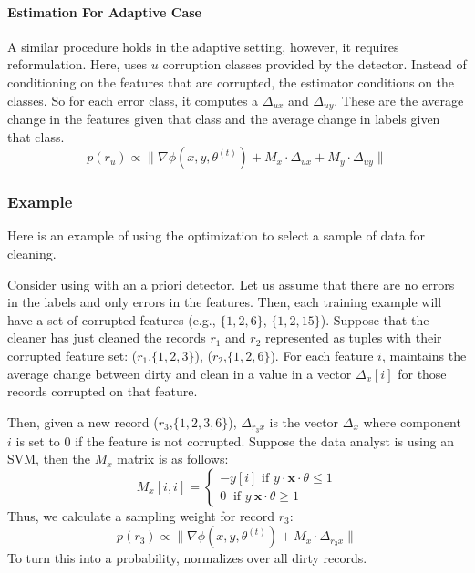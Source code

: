 \paragraph{Estimation For Adaptive Case}
A similar procedure holds in the adaptive setting, however, it requires reformulation.
Here, \sys uses $u$ corruption classes provided by the detector.
Instead of conditioning on the features that are corrupted, the estimator conditions on the classes.
So for each error class, it computes a $\Delta_{ux}$ and $\Delta_{uy}$.
These are the average change in the features given that class and the average change in labels given that class.
\[
p(r_u)\propto\|\nabla\phi(x,y,\theta^{(t)}) + M_x \cdot \Delta_{ux} +  M_y \cdot \Delta_{uy}\|
\] 

\subsubsection{Example}
Here is an example of using the optimization to select a sample of data for cleaning.
\begin{example}\label{estex}
Consider using \sys with an a priori detector.
Let us assume that there are no errors in the labels and only errors in the features.
Then, each training example will have a set of corrupted features (e.g., $\{1,2,6\}$, $\{1,2,15\}$).
Suppose that the cleaner has just cleaned the records $r_1$ and $r_2$ represented as tuples with their corrupted feature set: ($r_1$,$\{1,2,3\}$), ($r_2$,$\{1,2,6\}$).
For each feature $i$, \sys maintains the average change between dirty and clean in a value in a vector $\Delta_x[i]$ for those records corrupted on that feature. 

Then, given a new record ($r_3$,$\{1,2,3,6\}$), $\Delta_{r_3x}$ is the vector $\Delta_x$ where component $i$ is set to 0 if the feature is not corrupted.
Suppose the data analyst is using an SVM, then the $M_x$ matrix is as follows:
\[
M_x[i,i] = \begin{cases}      
-y[i] \text{ if } y\cdot\boldsymbol{x}\cdot\theta \le 1 \\
0\ \text{ if } y\ \boldsymbol{x}\cdot\theta \geq 1      
\end{cases} 
\]
Thus, we calculate a sampling weight for record $r_3$:
\[
p(r_3) \propto\|\nabla\phi(x,y,\theta^{(t)}) + M_x \cdot \Delta_{r_3x} \|
\] 
To turn this into a probability, \sys normalizes over all dirty records.
\end{example}


